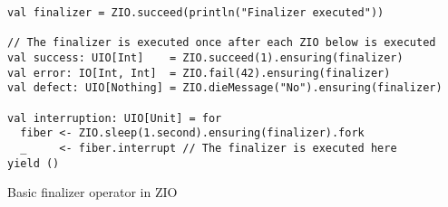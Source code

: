 \begin{algorithm}

\begin{verbatim}
val finalizer = ZIO.succeed(println("Finalizer executed"))

// The finalizer is executed once after each ZIO below is executed
val success: UIO[Int]    = ZIO.succeed(1).ensuring(finalizer)
val error: IO[Int, Int]  = ZIO.fail(42).ensuring(finalizer)
val defect: UIO[Nothing] = ZIO.dieMessage("No").ensuring(finalizer)

val interruption: UIO[Unit] = for
  fiber <- ZIO.sleep(1.second).ensuring(finalizer).fork
  _     <- fiber.interrupt // The finalizer is executed here
yield ()
\end{verbatim}

\caption{Basic finalizer operator  in ZIO \label{zio:finalizers}}
\end{algorithm}